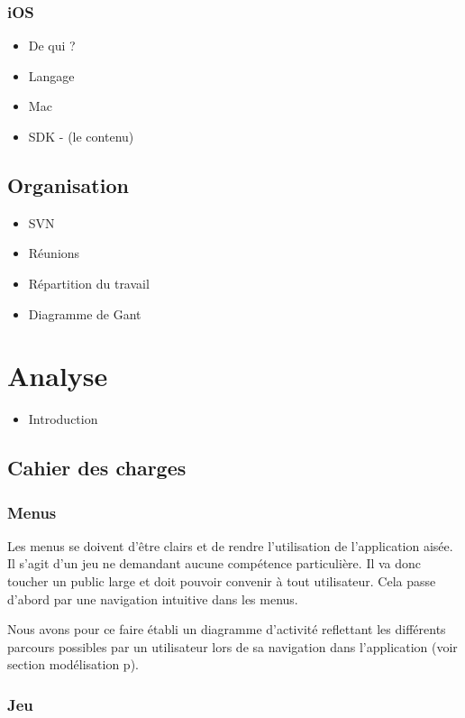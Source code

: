 \documentclass[a4paper,11pt]{report}
\begin{document}
		\subsection{iOS}
			\begin{itemize}
				\item{De qui ?}
				\item{Langage}
				\item{Mac}
				\item{SDK - (le contenu)}
			\end{itemize}
			
	\section{Organisation}
		\begin{itemize}
			\item{SVN}
			\item{Réunions}
			\item{Répartition du travail}
			\item{Diagramme de Gant}
		\end{itemize}
	
	
\chapter{Analyse}
	\begin{itemize}
		\item{Introduction}
	\end{itemize}
	
	\section{Cahier des charges}
		\subsection{Menus}
		
		Les menus se doivent d'être clairs et de rendre l'utilisation de
		l'application aisée. Il s'agit d'un jeu ne demandant aucune compétence
		particulière. Il va donc toucher un public large et doit pouvoir convenir à
		tout utilisateur. Cela passe d'abord par une navigation intuitive dans les
		menus.
		
		Nous avons pour ce faire établi un diagramme d'activité reflettant les
		différents parcours possibles par un utilisateur lors de sa navigation dans
		l'application (voir section modélisation p\pageref{activité}).
		
		\subsection{Jeu}
		
\end{document}
